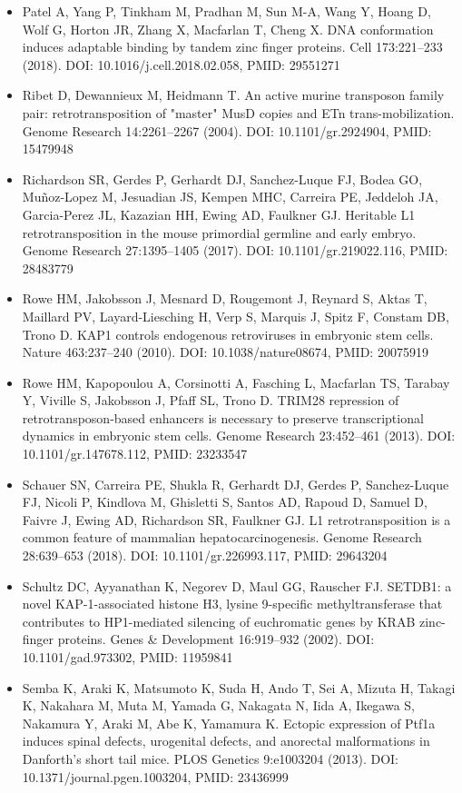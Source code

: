 \documentclass[11pt,a4paper]{article}
\begin{document}
\begin{itemize}
\item Patel A, Yang P, Tinkham M, Pradhan M, Sun M-A, Wang Y, Hoang D, Wolf G, Horton JR, Zhang X, Macfarlan T, Cheng X. DNA conformation induces adaptable binding by tandem zinc finger proteins. Cell 173:221–233 (2018). DOI: 10.1016/j.cell.2018.02.058, PMID: 29551271
\item Ribet D, Dewannieux M, Heidmann T. An active murine transposon family pair: retrotransposition of "master" MusD copies and ETn trans-mobilization. Genome Research 14:2261–2267 (2004). DOI: 10.1101/gr.2924904, PMID: 15479948
\item Richardson SR, Gerdes P, Gerhardt DJ, Sanchez-Luque FJ, Bodea GO, Muñoz-Lopez M, Jesuadian JS, Kempen MHC, Carreira PE, Jeddeloh JA, Garcia-Perez JL, Kazazian HH, Ewing AD, Faulkner GJ. Heritable L1 retrotransposition in the mouse primordial germline and early embryo. Genome Research 27:1395–1405 (2017). DOI: 10.1101/gr.219022.116, PMID: 28483779
\item Rowe HM, Jakobsson J, Mesnard D, Rougemont J, Reynard S, Aktas T, Maillard PV, Layard-Liesching H, Verp S, Marquis J, Spitz F, Constam DB, Trono D. KAP1 controls endogenous retroviruses in embryonic stem cells. Nature 463:237–240 (2010). DOI: 10.1038/nature08674, PMID: 20075919
\item Rowe HM, Kapopoulou A, Corsinotti A, Fasching L, Macfarlan TS, Tarabay Y, Viville S, Jakobsson J, Pfaff SL, Trono D. TRIM28 repression of retrotransposon-based enhancers is necessary to preserve transcriptional dynamics in embryonic stem cells. Genome Research 23:452–461 (2013). DOI: 10.1101/gr.147678.112, PMID: 23233547
\item Schauer SN, Carreira PE, Shukla R, Gerhardt DJ, Gerdes P, Sanchez-Luque FJ, Nicoli P, Kindlova M, Ghisletti S, Santos AD, Rapoud D, Samuel D, Faivre J, Ewing AD, Richardson SR, Faulkner GJ. L1 retrotransposition is a common feature of mammalian hepatocarcinogenesis. Genome Research 28:639–653 (2018). DOI: 10.1101/gr.226993.117, PMID: 29643204
\item Schultz DC, Ayyanathan K, Negorev D, Maul GG, Rauscher FJ. SETDB1: a novel KAP-1-associated histone H3, lysine 9-specific methyltransferase that contributes to HP1-mediated silencing of euchromatic genes by KRAB zinc-finger proteins. Genes \& Development 16:919–932 (2002). DOI: 10.1101/gad.973302, PMID: 11959841
\item Semba K, Araki K, Matsumoto K, Suda H, Ando T, Sei A, Mizuta H, Takagi K, Nakahara M, Muta M, Yamada G, Nakagata N, Iida A, Ikegawa S, Nakamura Y, Araki M, Abe K, Yamamura K. Ectopic expression of Ptf1a induces spinal defects, urogenital defects, and anorectal malformations in Danforth's short tail mice. PLOS Genetics 9:e1003204 (2013). DOI: 10.1371/journal.pgen.1003204, PMID: 23436999

\end{itemize}
\end{document}
